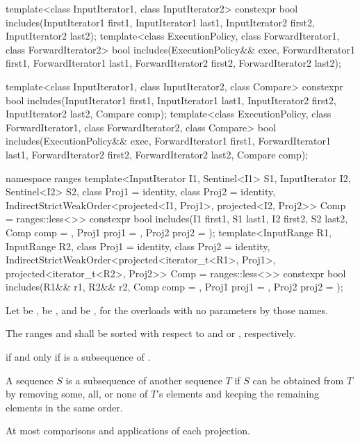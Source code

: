 %
\begin{itemdecl}
template<class InputIterator1, class InputIterator2>
  constexpr bool includes(InputIterator1 first1, InputIterator1 last1,
                          InputIterator2 first2, InputIterator2 last2);
template<class ExecutionPolicy, class ForwardIterator1, class ForwardIterator2>
  bool includes(ExecutionPolicy&& exec,
                ForwardIterator1 first1, ForwardIterator1 last1,
                ForwardIterator2 first2, ForwardIterator2 last2);

template<class InputIterator1, class InputIterator2, class Compare>
  constexpr bool includes(InputIterator1 first1, InputIterator1 last1,
                          InputIterator2 first2, InputIterator2 last2,
                          Compare comp);
template<class ExecutionPolicy, class ForwardIterator1, class ForwardIterator2, class Compare>
  bool includes(ExecutionPolicy&& exec,
                ForwardIterator1 first1, ForwardIterator1 last1,
                ForwardIterator2 first2, ForwardIterator2 last2,
                Compare comp);

namespace ranges {
  template<InputIterator I1, Sentinel<I1> S1, InputIterator I2, Sentinel<I2> S2,
      class Proj1 = identity, class Proj2 = identity,
      IndirectStrictWeakOrder<projected<I1, Proj1>, projected<I2, Proj2>> Comp = ranges::less<>>
    constexpr bool includes(I1 first1, S1 last1, I2 first2, S2 last2, Comp comp = {},
                            Proj1 proj1 = {}, Proj2 proj2 = {});
  template<InputRange R1, InputRange R2, class Proj1 = identity,
      class Proj2 = identity,
      IndirectStrictWeakOrder<projected<iterator_t<R1>, Proj1>,
        projected<iterator_t<R2>, Proj2>> Comp = ranges::less<>>
    constexpr bool includes(R1&& r1, R2&& r2, Comp comp = {},
                            Proj1 proj1 = {}, Proj2 proj2 = {});
}
\end{itemdecl}

\begin{itemdescr}
\pnum
Let  be ,
 be , and
 be ,
for the overloads with no parameters by those names.

\pnum
\requires
The ranges  and 
shall be sorted with respect to 
and  or , respectively.

\pnum
\returns
{}
if and only if  is a subsequence of .
\begin{note}
A sequence $S$ is a subsequence of another sequence $T$ if $S$ can be obtained
from $T$ by removing some, all, or none of $T$'s elements and keeping the
remaining elements in the same order.
\end{note}

\pnum
\complexity
At most
comparisons and applications of each projection.
\end{itemdescr}

